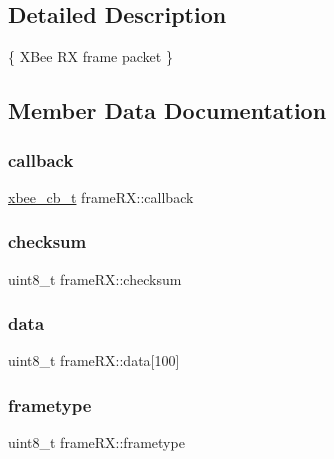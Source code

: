 \subsection{Detailed Description}
\{ X\+Bee RX frame packet \} 

\subsection{Member Data Documentation}
\mbox{\label{structframe_r_x_a9483c0994c50cd55141215e73a75b95b}} 
\subsubsection{\texorpdfstring{callback}{callback}}
{\footnotesize\ttfamily \hyperlink{networkdevice_8h_ad9c31236eed062640b6135a37fba175a}{xbee\+\_\+cb\+\_\+t} frame\+R\+X\+::callback}

\mbox{\label{structframe_r_x_a2ef590f48976b2550c7e12f2accf1e2f}} 
\subsubsection{\texorpdfstring{checksum}{checksum}}
{\footnotesize\ttfamily uint8\+\_\+t frame\+R\+X\+::checksum}

\mbox{\label{structframe_r_x_afdb061e4b3b406bf4890e95de2fbf474}} 
\subsubsection{\texorpdfstring{data}{data}}
{\footnotesize\ttfamily uint8\+\_\+t frame\+R\+X\+::data\mbox{[}100\mbox{]}}

\mbox{\label{structframe_r_x_a4684f3a419d7c6eaf5bded40cec73cdf}} 
\subsubsection{\texorpdfstring{frametype}{frametype}}
{\footnotesize\ttfamily uint8\+\_\+t frame\+R\+X\+::frametype}

